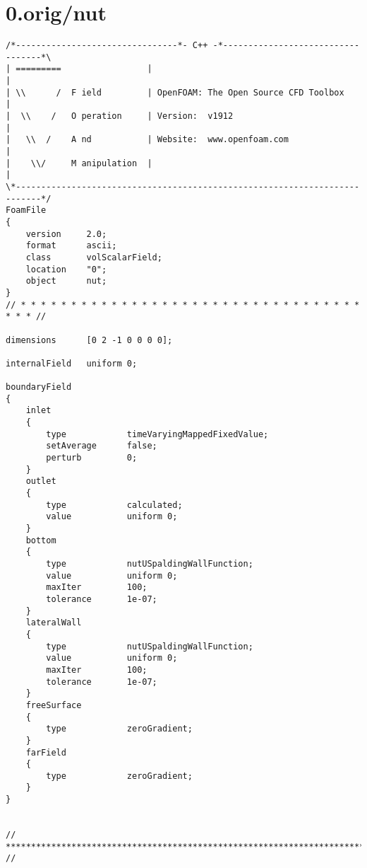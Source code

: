 \section{0.orig/nut}
\begin{lstlisting}
/*--------------------------------*- C++ -*----------------------------------*\
| =========                 |                                                 |
| \\      /  F ield         | OpenFOAM: The Open Source CFD Toolbox           |
|  \\    /   O peration     | Version:  v1912                                 |
|   \\  /    A nd           | Website:  www.openfoam.com                      |
|    \\/     M anipulation  |                                                 |
\*---------------------------------------------------------------------------*/
FoamFile
{
    version     2.0;
    format      ascii;
    class       volScalarField;
    location    "0";
    object      nut;
}
// * * * * * * * * * * * * * * * * * * * * * * * * * * * * * * * * * * * * * //

dimensions      [0 2 -1 0 0 0 0];

internalField   uniform 0;

boundaryField
{
    inlet
	{
		type       		timeVaryingMappedFixedValue;
		setAverage      false;
		perturb         0;
    }
    outlet
    {
        type            calculated;
        value           uniform 0;
    }
    bottom
    {
        type            nutUSpaldingWallFunction;
        value           uniform 0;
        maxIter			100;
        tolerance		1e-07;
    }
    lateralWall
    {
        type            nutUSpaldingWallFunction;
        value           uniform 0;
        maxIter			100;
        tolerance		1e-07;
    }
    freeSurface
    {
        type            zeroGradient;
    }
    farField
    {
		type			zeroGradient;
	}
}


// ************************************************************************* //

\end{lstlisting}

